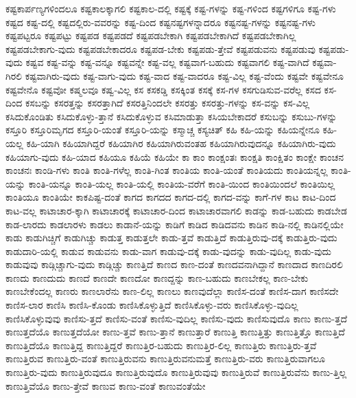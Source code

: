 {ಕಷ್ಟಕಾರ್ಪಣ್ಯಗಳಿಂದಲೂ
ಕಷ್ಟಕಾಲಕ್ಕಾಗಲಿ
ಕಷ್ಟಕಾಲ-ದಲ್ಲಿ
ಕಷ್ಟಕ್ಕೆ
ಕಷ್ಟ-ಗಳನ್ನು
ಕಷ್ಟ-ಗಳಿಂದ
ಕಷ್ಟಗಳಿಗೂ
ಕಷ್ಟ-ಗಳು
ಕಷ್ಟದ
ಕಷ್ಟ-ದಲ್ಲಿ
ಕಷ್ಟದಲ್ಲಿರು-ವವರನ್ನು
ಕಷ್ಟ-ದಿಂದ
ಕಷ್ಟನಷ್ಟಗಳನ್ನಾದರೂ
ಕಷ್ಟನಷ್ಟ-ಗಳನ್ನು
ಕಷ್ಟನಷ್ಟ-ಗಳು
ಕಷ್ಟಪಟ್ಟರೂ
ಕಷ್ಟಪಟ್ಟು
ಕಷ್ಟಪಡ
ಕಷ್ಟಪಡದೆ
ಕಷ್ಟಪಡಬೇಕಾಗಿ
ಕಷ್ಟಪಡಬೇಕಾಗಿದೆ
ಕಷ್ಟಪಡಬೇಕಾಗಿಲ್ಲ
ಕಷ್ಟಪಡಬೇಕಾಗು-ವುದು
ಕಷ್ಟಪಡಬೇಕಾದರೂ
ಕಷ್ಟಪಡ-ಬೇಕು
ಕಷ್ಟಪಡು-ತ್ತೇವೆ
ಕಷ್ಟಪಡುವನು
ಕಷ್ಟಪಡುವು
ಕಷ್ಟಪಡು-ವುದು
ಕಷ್ಟವ
ಕಷ್ಟ-ವನ್ನು
ಕಷ್ಟ-ವನ್ನೂ
ಕಷ್ಟವನ್ನೇ
ಕಷ್ಟ-ವಲ್ಲ
ಕಷ್ಟವಾಗ-ಬಹುದು
ಕಷ್ಟವಾಗಲಿ
ಕಷ್ಟ-ವಾಗಿದೆ
ಕಷ್ಟವಾ-ಗಿರಲಿ
ಕಷ್ಟವಾಗಿರು-ವುದು
ಕಷ್ಟ-ವಾಗು-ವುದು
ಕಷ್ಟ-ವಾದ
ಕಷ್ಟ-ವಾದರೂ
ಕಷ್ಟ-ವಿಲ್ಲ
ಕಷ್ಟ-ವೆಂದು
ಕಷ್ಟವೇ
ಕಷ್ಟವೇನೂ
ಕಷ್ಟವೇನೊ
ಕಷ್ಟವೋ
ಕಷ್ಮಲವೂ
ಕಷ್ವ-ವಿಲ್ಲ
ಕಸ
ಕಸಕಡ್ಡಿ
ಕಸಕ್ಕಿಂತ
ಕಸಕ್ಕೆ
ಕಸ-ಗಳ
ಕಸಗುಡಿಸುವ-ವರೆಲ್ಲ
ಕಸದ
ಕಸ-ದಿಂದ
ಕಸಬನ್ನು
ಕಸರತ್ತನ್ನು
ಕಸರತ್ತಾಗಿದೆ
ಕಸರತ್ತಿನಿಂದಲೇ
ಕಸರತ್ತು
ಕಸರತ್ತು-ಗಳನ್ನು
ಕಸ-ವನ್ನು
ಕಸ-ವಿಲ್ಲ
ಕಸಿದುಕೊಂಡಿತು
ಕಸಿದುಕೊಳ್ಳು-ತ್ತಾನೆ
ಕಸಿದುಕೊಳ್ಳುವ
ಕಸಿಮಾಡುತ್ತಾ
ಕಸಿಯಬೇಕಾದರೆ
ಕಸುಬನ್ನು
ಕಸುಬು-ಗಳನ್ನು
ಕಸ್ತೂರಿ
ಕಸ್ತೂರಿಮೃಗದ
ಕಸ್ತೂರಿ-ಯಂತೆ
ಕಸ್ತೂರಿ-ಯನ್ನು
ಕಸ್ಮಾಚ್ಚ
ಕಸ್ಯಚಿತ್
ಕಹಿ
ಕಹಿ-ಯನ್ನು
ಕಹಿಯನ್ನೇನೂ
ಕಹಿ-ಯಲ್ಲ
ಕಹಿ-ಯಾಗಿ
ಕಹಿಯಾಗಿದ್ದರೆ
ಕಹಿಯಾಗಿರ
ಕಹಿಯಾಗಿರುವಂತಹ
ಕಹಿಯಾಗಿರುವುದನ್ನೂ
ಕಹಿಯಾಗಿರು-ವುದು
ಕಹಿಯಾಗು-ವುದು
ಕಹಿ-ಯಾದ
ಕಹಿಯೂ
ಕಹಿಯೆ
ಕಹಿಯೇ
ಕಾ
ಕಾಂ
ಕಾಂಕ್ಷಂತಃ
ಕಾಂಕ್ಷತಿ
ಕಾಂಕ್ಷಿತಂ
ಕಾಂಕ್ಷೇ
ಕಾಂಚನ
ಕಾಂಚನಃ
ಕಾಂಡಿ-ಗಳು
ಕಾಂತಿ
ಕಾಂತಿ-ಗಳೆಲ್ಲ
ಕಾಂತಿ-ಗಿಂತ
ಕಾಂತಿಯ
ಕಾಂತಿ-ಯಂತೆ
ಕಾಂತಿಯದು
ಕಾಂತಿಯನ್ನಲ್ಲ
ಕಾಂತಿ-ಯನ್ನು
ಕಾಂತಿ-ಯನ್ನೂ
ಕಾಂತಿ-ಯಲ್ಲ
ಕಾಂತಿ-ಯಲ್ಲಿ
ಕಾಂತಿಯ-ವರೆಗೆ
ಕಾಂತಿ-ಯಿಂದ
ಕಾಂತಿಯಿಂದಲೆ
ಕಾಂತಿಯಿಲ್ಲ
ಕಾಂತಿಯೂ
ಕಾಂತಿಯೇ
ಕಾಕಪಿಷ್ಟ-ದಂತೆ
ಕಾಗದ
ಕಾಗದದ
ಕಾಗದ-ದಲ್ಲಿ
ಕಾಗದ-ವನ್ನು
ಕಾಗೆ-ಗಳ
ಕಾಟ
ಕಾಟ-ದಿಂದ
ಕಾಟ-ವಲ್ಲ
ಕಾಟಾಚಾರ-ಕ್ಕಾಗಿ
ಕಾಟಾಚಾರಕ್ಕೆ
ಕಾಟಾಚಾರ-ದಿಂದ
ಕಾಟಾಚಾರವಾಗಲಿ
ಕಾಡನ್ನು
ಕಾಡ-ಬಹುದು
ಕಾಡಬೇಡ
ಕಾಡ-ಲಾರದು
ಕಾಡಲಾರಳು
ಕಾಡಲು
ಕಾಡಾನೆ-ಯನ್ನು
ಕಾಡಿಗೆ
ಕಾಡಿದ
ಕಾಡಿದವನು
ಕಾಡಿನ
ಕಾಡಿ-ನಲ್ಲಿ
ಕಾಡಿನಲ್ಲಿಯೇ
ಕಾಡು
ಕಾಡುಗಿಚ್ಚಿಗೆ
ಕಾಡುಗಿಚ್ಚು
ಕಾಡುತ್ತ
ಕಾಡುತ್ತಲೇ
ಕಾಡು-ತ್ತವೆ
ಕಾಡುತ್ತಿದೆ
ಕಾಡುತ್ತಿರುವು-ದಕ್ಕೆ
ಕಾಡುತ್ತಿರು-ವುದು
ಕಾಡುದಾರಿ-ಯಲ್ಲಿ
ಕಾಡುವ
ಕಾಡುವನು
ಕಾಡು-ವಾಗ
ಕಾಡುವು-ದಕ್ಕೆ
ಕಾಡು-ವುದನ್ನು
ಕಾಡು-ವುದಿಲ್ಲ
ಕಾಡು-ವುದು
ಕಾಡುವುವು
ಕಾಡ್ಗಿಚ್ಚಾಗು-ವುದು
ಕಾಡ್ಗಿಚ್ಚು
ಕಾಣತ್ತಿದೆ
ಕಾಣದ
ಕಾಣ-ದಂತೆ
ಕಾಣದವನಾಗಿದ್ದಾನೆ
ಕಾಣದಾದ
ಕಾಣದಿರಲಿ
ಕಾಣದು
ಕಾಣದುದು
ಕಾಣದೆ
ಕಾಣದೇ
ಕಾಣದೋ
ಕಾಣದ್ದನ್ನು
ಕಾಣ-ಬಹುದು
ಕಾಣಬೇಕಲ್ಲ
ಕಾಣ-ಬೇಕು
ಕಾಣಬೇಕೆಂದಲ್ಲ
ಕಾಣರು
ಕಾಣಲಾರೆನು
ಕಾಣ-ಲಿಲ್ಲ
ಕಾಣಲು
ಕಾಣವುದೆಲ್ಲಾ
ಕಾಣಿಸ-ದಂತೆ
ಕಾಣಿಸ-ದಾಗ
ಕಾಣಿಸದೇ
ಕಾಣಿಸ-ಲಾರ
ಕಾಣಿಸಿ
ಕಾಣಿಸಿ-ಕೊಂಡು
ಕಾಣಿಸಿಕೊಳ್ಳುತ್ತಿದೆ
ಕಾಣಿಸಿಕೊಳ್ಳು-ವರು
ಕಾಣಿಸಿಕೊಳ್ಳು-ವುದಿಲ್ಲ
ಕಾಣಿಸಿಕೊಳ್ಳುವುವು
ಕಾಣಿಸು-ತ್ತದೆ
ಕಾಣಿಸು-ವಂತೆ
ಕಾಣಿಸು-ವುದಿಲ್ಲ
ಕಾಣಿಸು-ವುದು
ಕಾಣಿಸುವುದೊ
ಕಾಣು
ಕಾಣು-ತ್ತದೆ
ಕಾಣುತ್ತದೆಯೊ
ಕಾಣುತ್ತದೆಯೋ
ಕಾಣು-ತ್ತವೆ
ಕಾಣು-ತ್ತಾನೆ
ಕಾಣುತ್ತಾರೆ
ಕಾಣುತ್ತಿ
ಕಾಣುತ್ತಿತ್ತು
ಕಾಣುತ್ತಿತ್ತೊ
ಕಾಣುತ್ತಿದೆ
ಕಾಣುತ್ತಿದೆಯೊ
ಕಾಣುತ್ತಿದ್ದ
ಕಾಣುತ್ತಿದ್ದರೆ
ಕಾಣುತ್ತಿರ-ಬಹುದು
ಕಾಣುತ್ತಿರ-ಲಿಲ್ಲ
ಕಾಣುತ್ತಿರು
ಕಾಣುತ್ತಿರು-ತ್ತವೆ
ಕಾಣುತ್ತಿರುವ
ಕಾಣುತ್ತಿರು-ವಂತೆ
ಕಾಣುತ್ತಿರುವನು
ಕಾಣುತ್ತಿರುವನುಮತ್ತೆ
ಕಾಣುತ್ತಿರು-ವರು
ಕಾಣುತ್ತಿರುವಾಗಲೂ
ಕಾಣುತ್ತಿರು-ವುದು
ಕಾಣುತ್ತಿರುವುದೂ
ಕಾಣುತ್ತಿರುವುದೊ
ಕಾಣುತ್ತಿರುವುವು
ಕಾಣುತ್ತಿರುವೆ
ಕಾಣುತ್ತಿರುವೆನು
ಕಾಣು-ತ್ತಿಲ್ಲ
ಕಾಣುತ್ತಿವೆಯೊ
ಕಾಣು-ತ್ತೇವೆ
ಕಾಣುವ
ಕಾಣು-ವಂತೆ
ಕಾಣುವಂತೆಯೇ
}
